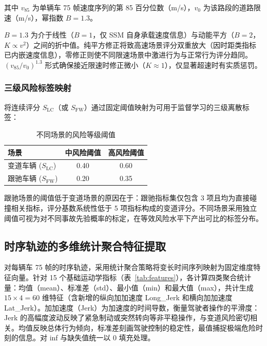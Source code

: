 \documentclass[preprint,review,12pt,a4paper]{elsarticle}
\begin{document}
其中 $v_{85}$ 为单辆车 75 帧速度序列的第 85 百分位数（m/s），$v_0$ 为该路段的道路限速（m/s），幂指数 $B = 1.3$。

$B=1.3$ 为介于线性（$B=1$，仅 SSM 自身承载速度信息）与动能平方（$B=2$，$K\propto v^2$）之间的折中值。纯平方修正将致高速场景评分双重放大（因时距类指标已内嵌速度信息），零修正则使不同限速场景中激进行为与正常行为评分趋同。$(v_{85}/v_0)^{1.3}$ 形式确保接近限速时修正微小（$K\approx1$），仅显著超速时有实质惩罚。

\subsubsection{三级风险标签映射}

将连续评分 $S_{\text{LC}}$（或 $S_{\text{FW}}$）通过固定阈值映射为可用于监督学习的三级离散标签：

\begin{table}[H]
\centering
\caption{不同场景的风险等级阈值}
\label{tab:risk_thresholds}
\small
\begin{tabular}{lcc}
\toprule
场景 & 中风险阈值 & 高风险阈值 \\
\midrule
变道车辆 ($S_{\text{LC}}$) & 0.40 & 0.60 \\
跟驰车辆 ($S_{\text{FW}}$) & 0.20 & 0.35 \\
\bottomrule
\end{tabular}
\end{table}

跟驰场景的阈值低于变道场景的原因在于：跟驰指标集仅包含 3 项且均为直接碰撞相关指标，评分基数系统性低于 5 项指标构成的变道评分。不同场景采用独立阈值可视为对不同事故先验概率的标定，在等效风险水平下产出可比的标签分布。

\subsection{时序轨迹的多维统计聚合特征提取}

对每辆车 75 帧的时序轨迹，采用统计聚合策略将变长时间序列映射为固定维度特征向量。针对 15 个基础运动学指标（表~\ref{tab:features}），各计算四类聚合统计量：均值（mean）、标准差（std）、最小值（min）和最大值（max），共计生成 $15 \times 4 = 60$ 维特征（含新增的纵向加加速度 Long\_Jerk 和横向加加速度 Lat\_Jerk）。加加速度（Jerk）为加速度的时间导数，衡量驾驶者操作的平滑度：Jerk 的高幅度波动反映了紧急制动或突然转向等非平稳操作，与变道风险密切相关。均值反映总体行为倾向，标准差刻画驾驶控制的稳定性，最值捕捉极端危险时刻的信息。对 inf 与缺失值统一以 0 填充处理。
\end{document}

